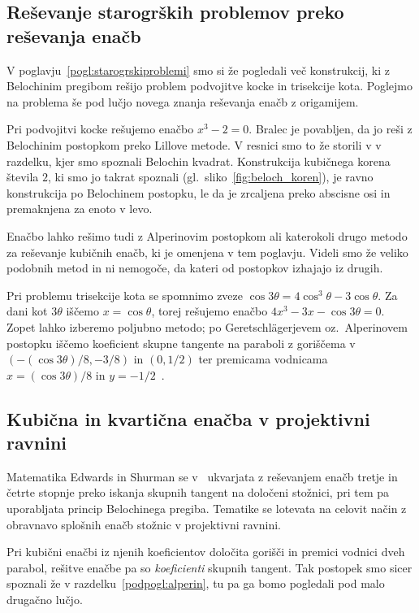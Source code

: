\subsection{Reševanje starogrških problemov preko reševanja enačb}

V poglavju~\ref{pogl:starogrskiproblemi} smo si že pogledali več konstrukcij, ki z Belochinim pregibom rešijo problem podvojitve kocke in trisekcije kota. Poglejmo na problema še pod lučjo novega znanja reševanja enačb z origamijem.

Pri podvojitvi kocke rešujemo enačbo $x^3 - 2 = 0$. Bralec je povabljen, da jo reši z Belochinim postopkom preko Lillove metode. V resnici smo to že storili v v razdelku, kjer smo spoznali Belochin kvadrat. Konstrukcija kubičnega korena števila $2$, ki smo jo takrat spoznali (gl.\ sliko~\ref{fig:beloch_koren}), je ravno konstrukcija po Belochinem postopku, le da je zrcaljena preko abscisne osi in premaknjena za enoto v levo.

Enačbo lahko rešimo tudi z Alperinovim postopkom ali katerokoli drugo metodo za reševanje kubičnih enačb, ki je omenjena v tem poglavju. Videli smo že veliko podobnih metod in ni nemogoče, da kateri od postopkov izhajajo iz drugih.

Pri problemu trisekcije kota se spomnimo zveze $\cos 3\theta = 4 \cos^3 \theta - 3 \cos \theta$. Za dani kot $3 \theta$ iščemo $x = \cos \theta$, torej rešujemo enačbo $4x^3-3x-\cos 3\theta=0$. Zopet lahko izberemo poljubno metodo; po Geretschlägerjevem oz.\ Alperinovem postopku iščemo koeficient skupne tangente na paraboli z goriščema v $(-(\cos 3 \theta) / 8, -3/8)$ in $(0, 1/2)$ ter premicama vodnicama $x = (\cos 3 \theta) / 8$ in $y = -1/2$~\cite[str.\ 370]{geret1995}.

\subsection{Kubična in kvartična enačba v projektivni ravnini}
\label{podpogl:afina_proj_enacbe}

Matematika Edwards in Shurman se v~\cite{edwards2001} ukvarjata z reševanjem enačb tretje in četrte stopnje preko iskanja skupnih tangent na določeni stožnici, pri tem pa uporabljata princip Belochinega pregiba. Tematike se lotevata na celovit način z obravnavo splošnih enačb stožnic v projektivni ravnini.

Pri kubični enačbi iz njenih koeficientov določita gorišči in premici vodnici dveh parabol, rešitve enačbe pa so \emph{koeficienti} skupnih tangent. Tak postopek smo sicer spoznali že v razdelku~\ref{podpogl:alperin}, tu pa ga bomo pogledali pod malo drugačno lučjo.

